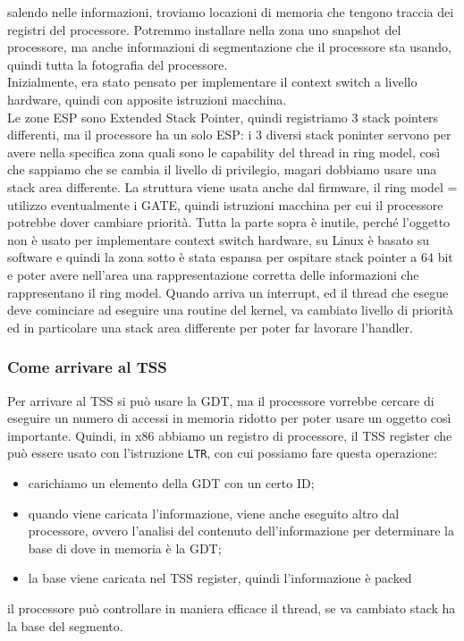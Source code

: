\documentclass[12pt, oneside]{extbook}
\begin{document}
salendo nelle informazioni, troviamo locazioni di memoria che tengono traccia dei registri del processore. Potremmo installare nella zona uno snapshot del processore, ma anche informazioni di segmentazione che il processore sta usando, quindi tutta la fotografia del processore.\\ Inizialmente, era stato pensato per implementare il context switch a livello hardware, quindi con apposite istruzioni macchina.\\ Le zone ESP sono Extended Stack Pointer, quindi registriamo 3 stack pointers differenti, ma il processore ha un solo ESP: i 3 diversi stack poninter servono per avere nella specifica zona quali sono le capability del thread in ring model, così che sappiamo che se cambia il livello di privilegio, magari dobbiamo usare una stack area differente. La struttura viene usata anche dal firmware, il ring model = utilizzo eventualmente i GATE, quindi istruzioni macchina per cui il processore potrebbe dover cambiare priorità. Tutta la parte sopra è inutile, perché l'oggetto non è usato per implementare context switch hardware, su Linux è basato su software e quindi la zona sotto è stata espansa per ospitare stack pointer a 64 bit e poter avere nell'area una rappresentazione corretta delle informazioni che rappresentano il ring model. Quando arriva un interrupt, ed il thread che esegue deve cominciare ad eseguire una routine del kernel, va cambiato livello di priorità ed in particolare una stack area differente per poter far lavorare l'handler.
\subsubsection{Come arrivare al TSS}
Per arrivare al TSS si può usare la GDT, ma il processore vorrebbe cercare di eseguire un numero di accessi in memoria ridotto per poter usare un oggetto così importante. Quindi, in x86 abbiamo un registro di processore, il TSS register che può essere usato con l'istruzione \texttt{LTR}, con cui possiamo fare questa operazione:
\begin{itemize}
\item carichiamo un elemento della GDT con un certo ID;
\item quando viene caricata l'informazione, viene anche eseguito altro dal processore, ovvero l'analisi del contenuto dell'informazione per determinare la base di dove in memoria è la GDT;
\item la base viene caricata nel TSS register, quindi l'informazione è packed
\end{itemize}
il processore può controllare in maniera efficace il thread, se va cambiato stack ha la base del segmento.
\end{document}
